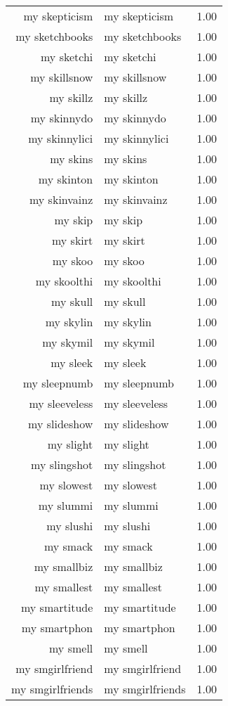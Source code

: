 \begin{table}[ht]
\begin{tabular}{rlr}
  my skepticism & my skepticism & 1.00 \\ 
  my sketchbooks & my sketchbooks & 1.00 \\ 
  my sketchi & my sketchi & 1.00 \\ 
  my skillsnow & my skillsnow & 1.00 \\ 
  my skillz & my skillz & 1.00 \\ 
  my skinnydo & my skinnydo & 1.00 \\ 
  my skinnylici & my skinnylici & 1.00 \\ 
  my skins & my skins & 1.00 \\ 
  my skinton & my skinton & 1.00 \\ 
  my skinvainz & my skinvainz & 1.00 \\ 
  my skip & my skip & 1.00 \\ 
  my skirt & my skirt & 1.00 \\ 
  my skoo & my skoo & 1.00 \\ 
  my skoolthi & my skoolthi & 1.00 \\ 
  my skull & my skull & 1.00 \\ 
  my skylin & my skylin & 1.00 \\ 
  my skymil & my skymil & 1.00 \\ 
  my sleek & my sleek & 1.00 \\ 
  my sleepnumb & my sleepnumb & 1.00 \\ 
  my sleeveless & my sleeveless & 1.00 \\ 
  my slideshow & my slideshow & 1.00 \\ 
  my slight & my slight & 1.00 \\ 
  my slingshot & my slingshot & 1.00 \\ 
  my slowest & my slowest & 1.00 \\ 
  my slummi & my slummi & 1.00 \\ 
  my slushi & my slushi & 1.00 \\ 
  my smack & my smack & 1.00 \\ 
  my smallbiz & my smallbiz & 1.00 \\ 
  my smallest & my smallest & 1.00 \\ 
  my smartitude & my smartitude & 1.00 \\ 
  my smartphon & my smartphon & 1.00 \\ 
  my smell & my smell & 1.00 \\ 
  my smgirlfriend & my smgirlfriend & 1.00 \\ 
  my smgirlfriends & my smgirlfriends & 1.00 \\ 

\end{tabular}
\end{table}
